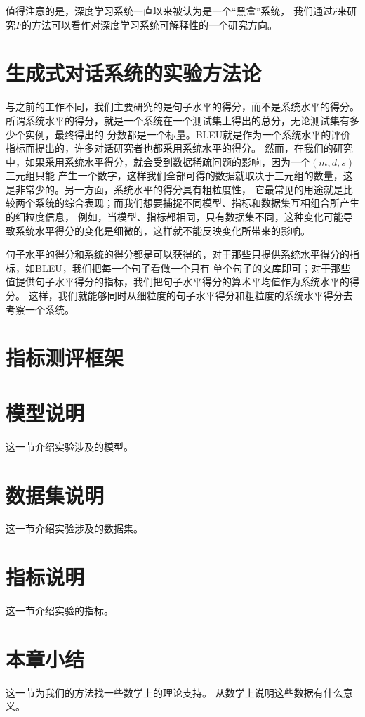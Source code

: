 值得注意的是，深度学习系统一直以来被认为是一个“黑盒”系统，
我们通过$\hat{r}$来研究$\mathit{F}$的方法可以看作对深度学习系统可解释性的一个研究方向。


\section{生成式对话系统的实验方法论}

与之前的工作不同，我们主要研究的是句子水平的得分，而不是系统水平的得分。
所谓系统水平的得分，就是一个系统在一个测试集上得出的总分，无论测试集有多少个实例，最终得出的
分数都是一个标量。BLEU就是作为一个系统水平的评价指标而提出的，许多对话研究者也都采用系统水平的得分。
然而，在我们的研究中，如果采用系统水平得分，就会受到数据稀疏问题的影响，因为一个$(m,d,s)$三元组只能
产生一个数字，这样我们全部可得的数据就取决于三元组的数量，这是非常少的。另一方面，系统水平的得分具有粗粒度性，
它最常见的用途就是比较两个系统的综合表现；而我们想要捕捉不同模型、指标和数据集互相组合所产生的细粒度信息，
例如，当模型、指标都相同，只有数据集不同，这种变化可能导致系统水平得分的变化是细微的，这样就不能反映变化所带来的影响。

句子水平的得分和系统的得分都是可以获得的，对于那些只提供系统水平得分的指标，如BLEU，我们把每一个句子看做一个只有
单个句子的文库即可；对于那些值提供句子水平得分的指标，我们把句子水平得分的算术平均值作为系统水平的得分。
这样，我们就能够同时从细粒度的句子水平得分和粗粒度的系统水平得分去考察一个系统。
\section{指标测评框架}\label{sec:指标测评框架}

\section{模型说明}\label{sec:模型说明}
这一节介绍实验涉及的模型。

\section{数据集说明}\label{sec:数据集说明}
这一节介绍实验涉及的数据集。

\section{指标说明}\label{sec:指标说明}
这一节介绍实验的指标。

\section{本章小结}\label{sec:本章小结2}
这一节为我们的方法找一些数学上的理论支持。
从数学上说明这些数据有什么意义。
